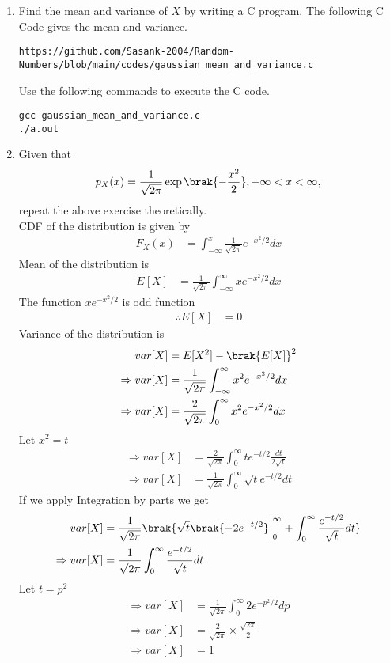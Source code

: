\documentclass[journal,12pt,twocolumn]{IEEEtran}
\renewcommand\thesection{\arabic{section}}
\begin{document}
\begin{enumerate}[label=\thesection.\arabic*
,ref=\thesection.\theenumi]
\item Find the mean and variance of $X$ by writing a C program.
\solution The following C Code gives the mean and variance. 
\begin{lstlisting}
https://github.com/Sasank-2004/Random-Numbers/blob/main/codes/gaussian_mean_and_variance.c
\end{lstlisting}
Use the following commands to execute the C code.
\begin{lstlisting}
gcc gaussian_mean_and_variance.c
./a.out
\end{lstlisting}
\item Given that 
\begin{align}
p_{X}(x) = \frac{1}{\sqrt{2\pi}}\exp\brak{-\frac{x^2}{2}}, -\infty < x < \infty,
\end{align}
repeat the above exercise theoretically.\\
%
\solution CDF of the distribution is given by 
\begin{align}
    F_X(x)  &=  \int_{-\infty}^{x} \frac{1}{\sqrt{2\pi}} e^{-x^2/2} dx
\end{align}
Mean of the distribution is 
\begin{align}
    E[X] &= \frac{1}{\sqrt{2\pi}}\int_{-\infty}^{\infty} xe^{-x^2/2} dx 
\end{align}
The function $xe^{-x^2/2}$ is odd function 
\begin{align}
    \therefore E[X] &= 0
\end{align}
Variance of the distribution is 
\begin{align}
    var[X] &= E[X^2] - \brak{E[X]}^2 \\
    \Rightarrow var[X] &= \frac{1}{\sqrt{2\pi}}\int_{-\infty}^{\infty} x^2e^{-x^2/2} dx \\
    \Rightarrow var[X] &= \frac{2}{\sqrt{2\pi}}\int_{0}^{\infty} x^2e^{-x^2/2} dx
\end{align}
Let $x^2 = t$
\begin{align}
    \Rightarrow var[X] &= \frac{2}{\sqrt{2\pi}} \int_{0}^{\infty} t e^{-t/2} \frac{dt}{2\sqrt{t}} \\ 
    \Rightarrow var[X] &= \frac{1}{\sqrt{2\pi}} \int_{0}^{\infty} \sqrt{t} e^{-t/2} dt
\end{align}
If we apply Integration by parts we get 
\begin{align}
    var[X] &= \frac{1}{\sqrt{2\pi}} \brak{ \sqrt{t}\brak{-2e^{-t/2}}\Bigr|_{0}^{\infty} + \int_{0}^{\infty} \frac{e^{-t/2}}{\sqrt{t}} dt } \\
    \Rightarrow var[X] &= \frac{1}{\sqrt{2\pi}} \int_{0}^{\infty} \frac{e^{-t/2}}{\sqrt{t}} dt
\end{align}
Let $t=p^2$
\begin{align}
    \Rightarrow var[X] &= \frac{1}{\sqrt{2\pi}} \int_{0}^{\infty} 2e^{-p^2/2} dp \\
    \Rightarrow var[X] &= \frac{2}{\sqrt{2\pi}} \times \frac{\sqrt{2\pi}}{2} \\
    \Rightarrow var[X] &= 1
\end{align}
\end{enumerate}
\end{document}
